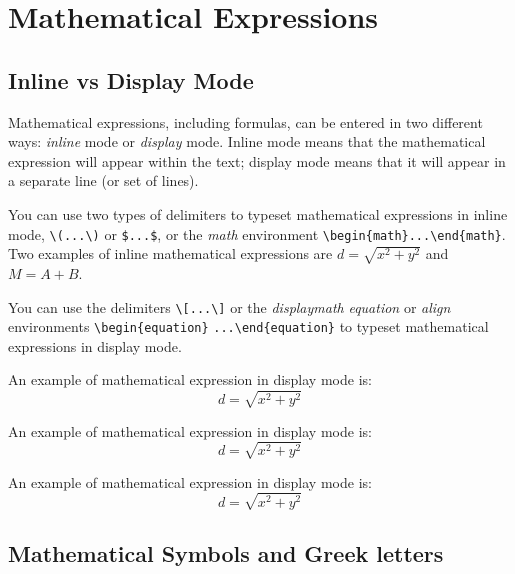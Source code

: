 \section{Mathematical Expressions}
\label{sec:Math}

\subsection{Inline vs Display Mode}
\label{sec:MathModes}

Mathematical expressions, including formulas, can be entered in two different ways: \emph{inline} mode or \emph{display} mode. 
Inline mode means that the mathematical expression will appear within the text; display mode means that it will appear in a separate line (or set of lines).

You can use two types of delimiters to typeset mathematical expressions in inline mode, \verb|\(...\)| or \verb|$...$|, or the \emph{math} environment \verb|\begin{math}...\end{math}|. 
Two examples of inline mathematical expressions are \(d=\sqrt{x^2+y^2}\) and $M = A + B$.

You can use the delimiters \verb|\[...\]| or the \emph{displaymath} \emph{equation} or \emph{align} environments \verb|\begin{equation}| \verb|...\end{equation}| to typeset mathematical expressions in display mode.

An example of mathematical expression in display mode is: \[d=\sqrt{x^2+y^2}\]

An example of mathematical expression in display mode is: \begin{displaymath}d=\sqrt{x^2+y^2}\end{displaymath}

An example of mathematical expression in display mode is: \begin{equation}d=\sqrt{x^2+y^2}\end{equation}



\subsection{Mathematical Symbols and Greek letters}
\label{sec:MathSymbols}

